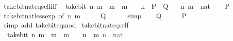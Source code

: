\begin{isabellebody}
\isanewline
%
\endisadelimproof
\isanewline
{}\isamarkupfalse%
\ take{\isacharunderscore}{\kern0pt}bit{\isacharunderscore}{\kern0pt}nat{\isacharunderscore}{\kern0pt}eq{\isacharunderscore}{\kern0pt}self{\isacharunderscore}{\kern0pt}iff{\isacharcolon}{\kern0pt}\isanewline
\ \ {\isacartoucheopen}take{\isacharunderscore}{\kern0pt}bit\ n\ m\ {\isacharequal}{\kern0pt}\ m\ {\isasymlongleftrightarrow}\ m\ {\isacharless}{\kern0pt}\ {}\ {\isacharcircum}{\kern0pt}\ n{\isacartoucheclose}\ {\isacharparenleft}{\kern0pt}\ {\isacartoucheopen}{\isacharquery}{\kern0pt}P\ {\isasymlongleftrightarrow}\ {\isacharquery}{\kern0pt}Q{\isacartoucheclose}{\isacharparenright}{\kern0pt}\isanewline
\ \ \ n\ m\ {\isacharcolon}{\kern0pt}{\isacharcolon}{\kern0pt}\ nat\isanewline
%
\isadelimproof
%
\endisadelimproof
%
\isatagproof
{}\isamarkupfalse%
\isanewline
\ \ \isamarkupfalse%
\ {\isacharquery}{\kern0pt}P\isanewline
\ \ \isamarkupfalse%
\ \isamarkupfalse%
\ take{\isacharunderscore}{\kern0pt}bit{\isacharunderscore}{\kern0pt}nat{\isacharunderscore}{\kern0pt}less{\isacharunderscore}{\kern0pt}exp\ {\isacharbrackleft}{\kern0pt}of\ n\ m{\isacharbrackright}{\kern0pt}\isanewline
\ \ \isamarkupfalse%
\ \isamarkupfalse%
\ {\isacharquery}{\kern0pt}Q\isanewline
\ \ \ \ \isamarkupfalse%
\ simp\isanewline
{}\isamarkupfalse%
\isanewline
\ \ \isamarkupfalse%
\ {\isacharquery}{\kern0pt}Q\isanewline
\ \ \isamarkupfalse%
\ \isamarkupfalse%
\ {\isacharquery}{\kern0pt}P\isanewline
\ \ \ \ \isamarkupfalse%
\ {\isacharparenleft}{\kern0pt}simp\ add{\isacharcolon}{\kern0pt}\ take{\isacharunderscore}{\kern0pt}bit{\isacharunderscore}{\kern0pt}eq{\isacharunderscore}{\kern0pt}mod{\isacharparenright}{\kern0pt}\isanewline
{}\isamarkupfalse%
%
\endisatagproof
{\isafoldproof}%
%
\isadelimproof
\isanewline
%
\endisadelimproof
\isanewline
{}\isamarkupfalse%
\ take{\isacharunderscore}{\kern0pt}bit{\isacharunderscore}{\kern0pt}nat{\isacharunderscore}{\kern0pt}eq{\isacharunderscore}{\kern0pt}self{\isacharcolon}{\kern0pt}\isanewline
\ \ {\isacartoucheopen}take{\isacharunderscore}{\kern0pt}bit\ n\ m\ {\isacharequal}{\kern0pt}\ m{\isacartoucheclose}\ \ {\isacartoucheopen}m\ {\isacharless}{\kern0pt}\ {}\ {\isacharcircum}{\kern0pt}\ n{\isacartoucheclose}\ \ m\ n\ {\isacharcolon}{\kern0pt}{\isacharcolon}{\kern0pt}\ nat\isanewline

\end{isabellebody}
